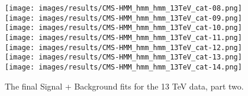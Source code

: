 \begin{figure}[h!]
    \centering
    \texttt{[image: images/results/CMS-HMM\_hmm\_hmm\_13TeV\_cat-08.png]}
    \texttt{[image: images/results/CMS-HMM\_hmm\_hmm\_13TeV\_cat-09.png]}
    \texttt{[image: images/results/CMS-HMM\_hmm\_hmm\_13TeV\_cat-10.png]}
    \texttt{[image: images/results/CMS-HMM\_hmm\_hmm\_13TeV\_cat-11.png]}
    \texttt{[image: images/results/CMS-HMM\_hmm\_hmm\_13TeV\_cat-12.png]}
    \texttt{[image: images/results/CMS-HMM\_hmm\_hmm\_13TeV\_cat-13.png]}
    \texttt{[image: images/results/CMS-HMM\_hmm\_hmm\_13TeV\_cat-14.png]}
    \caption[More signal + background fits for the individual categories on 13 TeV data.]
    {The final Signal + Background fits for the 13 TeV data, part two.}
    \label{fig:fitsbycat2}
\end{figure}
\clearpage
